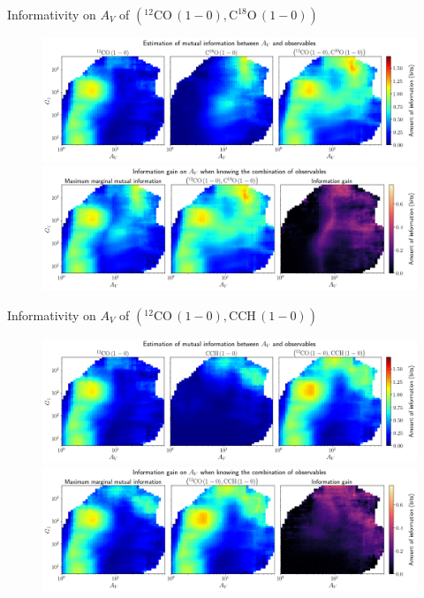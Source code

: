 \documentclass{beamer}
\begin{document}
\begin{frame}{Informativity on $A_V$ of $\left(\mathrm{^{12}CO\,(1-0)},\mathrm{C^{18}O\,(1-0)}\right)$}
    \begin{figure}
        \centering
        \includegraphics[width=0.95\linewidth]{../mi/av__12co10_c18o10_mi.png}
        \vfill
        \includegraphics[width=0.95\linewidth]{../mi/av__12co10_c18o10_mi_gain.png}
    \end{figure}
\end{frame}

\begin{frame}{Informativity on $A_V$ of $\left(\mathrm{^{12}CO\,(1-0)},\mathrm{CCH\,(1-0)}\right)$}
    \begin{figure}
        \centering
        \includegraphics[width=0.95\linewidth]{../mi/av__12co10_cch10_mi.png}
        \vfill
        \includegraphics[width=0.95\linewidth]{../mi/av__12co10_cch10_mi_gain.png}
    \end{figure}
\end{frame}
\end{document}
